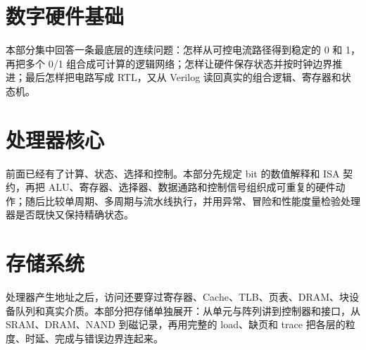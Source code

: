 \documentclass[UTF8,openany,zihao=5,fontset=none]{ctexbook}
\begin{document}


\tableofcontents

\part{数字硬件基础}
\begin{partbridge}
本部分集中回答一条最底层的连续问题：怎样从可控电流路径得到稳定的 0 和 1，再把多个 0/1 组合成可计算的逻辑网络；怎样让硬件保存状态并按时钟边界推进；最后怎样把电路写成 RTL，又从 Verilog 读回真实的组合逻辑、寄存器和状态机。
\end{partbridge}





\part{处理器核心}
\begin{partbridge}
前面已经有了计算、状态、选择和控制。本部分先规定 bit 的数值解释和 ISA 契约，再把 ALU、寄存器、选择器、数据通路和控制信号组织成可重复的硬件动作；随后比较单周期、多周期与流水线执行，并用异常、冒险和性能度量检验处理器是否既快又保持精确状态。
\end{partbridge}






\part{存储系统}
\begin{partbridge}
处理器产生地址之后，访问还要穿过寄存器、Cache、TLB、页表、DRAM、块设备队列和真实介质。本部分把存储单独展开：从单元与阵列讲到控制器和接口，从 SRAM、DRAM、NAND 到磁记录，再用完整的 load、缺页和  trace 把各层的粒度、时延、完成与错误边界连起来。
\end{partbridge}







\end{document}
